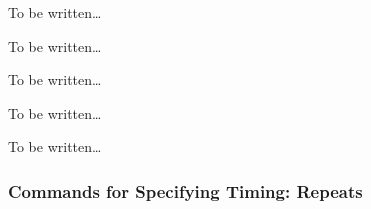 \begin{command}{\pgfsys@animation@path{}}
  To be written\dots
\end{command}

\begin{command}{\pgfsys@animation@translate{}}
  To be written\dots
\end{command}

\begin{command}{\pgfsys@animation@scale{}}
  To be written\dots
\end{command}

\begin{command}{\pgfsys@animation@rotate{}}
  To be written\dots
\end{command}

\begin{command}{\pgfsys@animation@viewbox{}}
  To be written\dots
\end{command}



\subsubsection{Commands for Specifying Timing: Repeats}

\def\showclock{
  \scoped [name=clock,fill=blue!50,shift={(1.25,-1.5)}] {
    \fill circle[radius=9mm];
    \foreach \s in {0,5,...,55} {
      \node [font=\tiny] at (90-\s*6:1.1cm)[] {\s s};
      \draw [white,very thin] (0,0) -- (90-\s*6:9mm); }
    \node [below,font=\small] {Click here};
    \fill [black] (-2pt,0pt) -- (90:0.9cm) -- (2pt,0pt) -- (0pt,-2pt) -- cycle
      [animate={begin on={click,of=clock}, 60s,
        max duration=10s, rotate={360...0}}]; }
  \pgfidrefprevuseornext{\clockid}{clock} }
\def\showtick{ 
  \foreach \i in {0,...,5} \draw (\i*.5,-1mm) -- ++(0,2mm) node [above] {\i}; }


